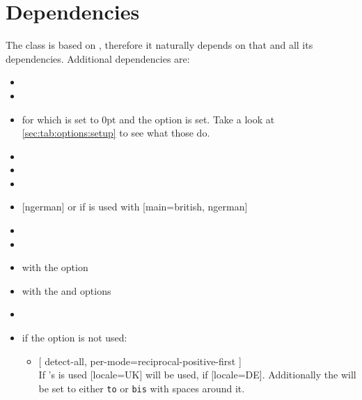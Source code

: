 \section{Dependencies}\label{sec:alone:dep}%
The class is based on , therefore it naturally depends on that
and all its dependencies. Additional dependencies are:
\begin{multicols}{2}%
  \begin{itemize}[leftmargin=10pt]
    \item {}
    \item {}
    \item {} for which  is set to 0pt and the option
       is set. Take a look at \autoref{sec:tab:options:setup} to
      see what those do.
    \item {}
    \item {}
    \item {}
    \item {} [ngerman] or if  is used with
      [main=british, ngerman]
    \item {}
    \item {}
    \item {} with the  option
    \item {} with the  and 
      options
    \item {}
    \item if the  option is not used:
      \begin{itemize}
        \item {}
          [%
            detect-all,
            per-mode=reciprocal-positive-first%
          ]\\
          If 's  is used [locale=UK] will be used, if
           [locale=DE]. Additionally the  will be
          set to either \texttt{to} or \texttt{bis} with spaces around it.
      \end{itemize}
  \end{itemize}
\end{multicols}%

